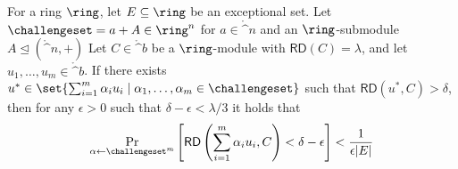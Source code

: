 \begin{theorem}
\label{thm:proximity gap}
For a ring $\ring$, let $E \subseteq \ring$ be an exceptional set. Let $\challengeset=a+A \in \ring^n$ for $a \in \ring^n$ and an $\ring$-submodule $A \trianglelefteq (\ring^n,+)$
Let $C \in \ring^b$ be a $\ring$-module with $\mathsf{RD}(C) = \lambda$, and let $u_1,\dotsc,u_m \in \ring^b$. If there exists $u^\ast \in \set{\sum_{i=1}^{m} \alpha_i u_i \mid \alpha_1,\dotsc,\alpha_m \in \challengeset}$ such that $\mathsf{RD}(u^\ast, C) > \delta$, then for any $\epsilon > 0$ such that $\delta-\epsilon < \lambda/3$ it holds that
\[
\Pr_{\alpha \gets \challengeset^m} \left[\mathsf{RD}\left(\sum_{i=1}^{m} \alpha_i u_i,C\right) < \delta - \epsilon\right] < \frac{1}{\epsilon |E|}
\]
\end{theorem}

